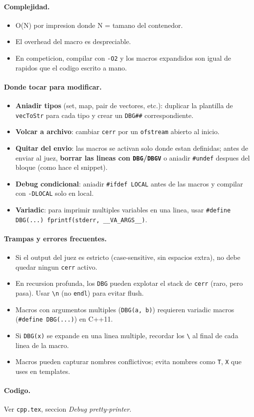 \paragraph{Complejidad.}
\begin{itemize}\setlength\itemsep{0pt}
	\item O(N) por impresion donde N = tamano del contenedor.
	\item El overhead del macro es despreciable.
	\item En competicion, compilar con \texttt{-O2} y los macros expandidos son igual de rapidos que el codigo escrito a mano.
\end{itemize}

\paragraph{Donde tocar para modificar.}
\begin{itemize}\setlength\itemsep{0pt}
	\item \textbf{Aniadir tipos} (set, map, pair de vectores, etc.): duplicar la plantilla de \texttt{vecToStr} para cada tipo y crear un \texttt{DBG\#\#} correspondiente.
	\item \textbf{Volcar a archivo}: cambiar \texttt{cerr} por un \texttt{ofstream} abierto al inicio.
	\item \textbf{Quitar del envio}: las macros se activan solo donde estan definidas; antes de enviar al juez, \textbf{borrar las lineas con \texttt{DBG}/\texttt{DBGV}} o aniadir \texttt{\#undef} despues del bloque (como hace el snippet).
	\item \textbf{Debug condicional}: aniadir \texttt{\#ifdef LOCAL} antes de las macros y compilar con \texttt{-DLOCAL} solo en local.
	\item \textbf{Variadic}: para imprimir multiples variables en una linea, usar \texttt{\#define DBG(...) fprintf(stderr, \_\_VA\_ARGS\_\_)}.
\end{itemize}

\paragraph{Trampas y errores frecuentes.}
\begin{itemize}\setlength\itemsep{0pt}
	\item Si el output del juez es estricto (case-sensitive, sin espacios extra), no debe quedar ningun \texttt{cerr} activo.
	\item En recursion profunda, los \texttt{DBG} pueden explotar el stack de \texttt{cerr} (raro, pero pasa). Usar \texttt{\textbackslash n} (no \texttt{endl}) para evitar flush.
	\item Macros con argumentos multiples (\texttt{DBG(a, b)}) requieren variadic macros (\texttt{\#define DBG(...)}) en C++11.
	\item Si \texttt{DBG(x)} se expande en una linea multiple, recordar los \texttt{\textbackslash} al final de cada linea de la macro.
	\item Macros pueden capturar nombres conflictivos; evita nombres como \texttt{T}, \texttt{X} que uses en templates.
\end{itemize}

\paragraph{Codigo.}
Ver \texttt{cpp.tex}, seccion \textit{Debug pretty-printer}.

\vspace{0.5em}
